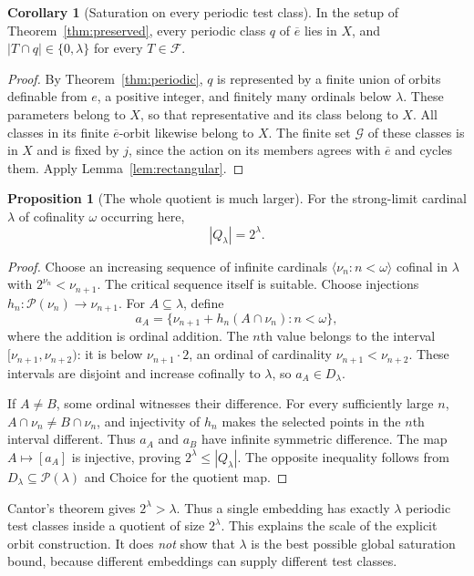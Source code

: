 \documentclass[11pt,letterpaper]{article}
\theoremstyle{definition}
\newtheorem{proposition}[definition]{Proposition}
\newtheorem{corollary}[definition]{Corollary}
\numberwithin{equation}{section}
\newcommand{\Pow}{\mathcal P}
\newcommand{\FF}{\mathcal F}
\newcommand{\ov}[1]{\overline{#1}}
\newcommand{\calG}{\mathcal G}
\begin{document}
\begin{corollary}[Saturation on every periodic test class]\label{cor:periodsat}
In the setup of Theorem~\ref{thm:preserved}, every periodic class $q$ of $\ov e$ lies in $X$, and $|T\cap q|\in\{0,\lambda\}$ for every $T\in\FF$.
\end{corollary}

\begin{proof}
By Theorem~\ref{thm:periodic}, $q$ is represented by a finite union of orbits definable from $e$, a positive integer, and finitely many ordinals below $\lambda$. These parameters belong to $X$, so that representative and its class belong to $X$. All classes in its finite $\ov e$-orbit likewise belong to $X$. The finite set $\calG$ of these classes is in $X$ and is fixed by $j$, since the action on its members agrees with $\ov e$ and cycles them. Apply Lemma~\ref{lem:rectangular}.
\end{proof}

\begin{proposition}[The whole quotient is much larger]\label{prop:quotientsize}
For the strong-limit cardinal $\lambda$ of cofinality $\omega$ occurring here,
\[
                            |Q_\lambda|=2^\lambda.
\]
\end{proposition}

\begin{proof}
Choose an increasing sequence of infinite cardinals $\langle\nu_n:n<\omega\rangle$ cofinal in $\lambda$ with $2^{\nu_n}<\nu_{n+1}$. The critical sequence itself is suitable. Choose injections $h_n:\Pow(\nu_n)\to\nu_{n+1}$. For $A\subseteq\lambda$, define
\[
        a_A=\{\nu_{n+1}+h_n(A\cap\nu_n):n<\omega\},
\]
where the addition is ordinal addition. The $n$th value belongs to the interval $[\nu_{n+1},\nu_{n+2})$: it is below $\nu_{n+1}\cdot2$, an ordinal of cardinality $\nu_{n+1}<\nu_{n+2}$. These intervals are disjoint and increase cofinally to $\lambda$, so $a_A\in D_\lambda$.

If $A\ne B$, some ordinal witnesses their difference. For every sufficiently large $n$, $A\cap\nu_n\ne B\cap\nu_n$, and injectivity of $h_n$ makes the selected points in the $n$th interval different. Thus $a_A$ and $a_B$ have infinite symmetric difference. The map $A\mapsto[a_A]$ is injective, proving $2^\lambda\le|Q_\lambda|$. The opposite inequality follows from $D_\lambda\subseteq\Pow(\lambda)$ and Choice for the quotient map.
\end{proof}

Cantor's theorem gives $2^\lambda>\lambda$. Thus a single embedding has exactly $\lambda$ periodic test classes inside a quotient of size $2^\lambda$. This explains the scale of the explicit orbit construction. It does \emph{not} show that $\lambda$ is the best possible global saturation bound, because different embeddings can supply different test classes.
\end{document}
